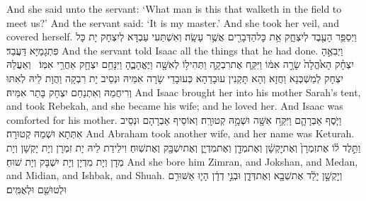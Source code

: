 {And she said unto the servant: ‘What man is this that walketh in the field to meet us?’ And the servant said: ‘It is my master.’ And she took her veil, and covered herself.}{}
{וַיְסַפֵּ֥ר הָעֶ֖בֶד לְיִצְחָ֑ק אֵ֥ת כׇּל\maqqaf הַדְּבָרִ֖ים אֲשֶׁ֥ר עָשָֽׂה׃}
{וְאִשְׁתַּעִי עַבְדָּא לְיִצְחָק יָת כָּל פִּתְגָמַיָּא דַּעֲבַד׃}
{And the servant told Isaac all the things that he had done.}{}
{וַיְבִאֶ֣הָ יִצְחָ֗ק הָאֹ֙הֱלָה֙ שָׂרָ֣ה אִמּ֔וֹ וַיִּקַּ֧ח אֶת\maqqaf רִבְקָ֛ה וַתְּהִי\maqqaf ל֥וֹ לְאִשָּׁ֖ה וַיֶּאֱהָבֶ֑הָ וַיִּנָּחֵ֥ם יִצְחָ֖ק אַחֲרֵ֥י אִמּֽוֹ׃ \petucha }
{וְאַעֲלַהּ יִצְחָק לְמַשְׁכְּנָא וַחֲזָא וְהָא תָּקְנִין עוּבָדַהָא כְּעוּבָדֵי שָׂרָה אִמֵּיהּ וּנְסֵיב יָת רִבְקָה וַהֲוָת לֵיהּ לְאִתּוּ וְרִיחֲמַהּ וְאִתְנַחַם יִצְחָק בָּתַר אִמֵּיהּ׃}
{And Isaac brought her into his mother Sarah’s tent, and took Rebekah, and she became his wife; and he loved her. And Isaac was comforted for his mother.}{}
\newperek
{}
{וַיֹּ֧סֶף אַבְרָהָ֛ם וַיִּקַּ֥ח אִשָּׁ֖ה וּשְׁמָ֥הּ קְטוּרָֽה׃}
{וְאוֹסֵיף אַבְרָהָם וּנְסֵיב אִתְּתָא וּשְׁמַהּ קְטוּרָה׃}
{And Abraham took another wife, and her name was Keturah.}{}
{וַתֵּ֣לֶד ל֗וֹ אֶת\maqqaf זִמְרָן֙ וְאֶת\maqqaf יׇקְשָׁ֔ן וְאֶת\maqqaf מְדָ֖ן וְאֶת\maqqaf מִדְיָ֑ן וְאֶת\maqqaf יִשְׁבָּ֖ק וְאֶת\maqqaf שֽׁוּחַ׃}
{וִילֵידַת לֵיהּ יָת זִמְרָן וְיָת יָקְשָׁן וְיָת מְדָן וְיָת מִדְיָן וְיָת יִשְׁבָּק וְיָת שׁוּחַ׃}
{And she bore him Zimran, and Jokshan, and Medan, and Midian, and Ishbak, and Shuah.}{}
{וְיׇקְשָׁ֣ן יָלַ֔ד אֶת\maqqaf שְׁבָ֖א וְאֶת\maqqaf דְּדָ֑ן וּבְנֵ֣י דְדָ֔ן הָי֛וּ אַשּׁוּרִ֥ם וּלְטוּשִׁ֖ם וּלְאֻמִּֽים׃}
